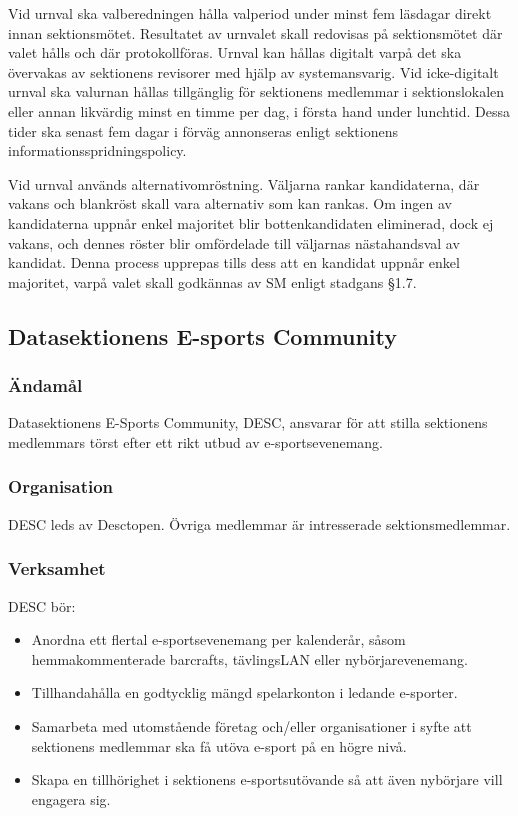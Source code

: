 \documentclass{dgovdoc}
\begin{document}
Vid urnval ska valberedningen hålla valperiod under minst fem läsdagar direkt
innan sektionsmötet. Resultatet av urnvalet skall redovisas på sektionsmötet
där valet hålls och där protokollföras. Urnval kan hållas digitalt varpå det
ska övervakas av sektionens revisorer med hjälp av systemansvarig. Vid icke-digitalt
urnval ska valurnan hållas tillgänglig för sektionens medlemmar i sektionslokalen
eller annan likvärdig minst en timme per dag, i första hand under lunchtid.
Dessa tider ska senast fem dagar i förväg annonseras enligt sektionens
informationsspridningspolicy.

Vid urnval används alternativomröstning. Väljarna rankar kandidaterna, där
vakans och blankröst skall vara alternativ som kan rankas. Om ingen av
kandidaterna uppnår enkel majoritet blir bottenkandidaten eliminerad, dock
ej vakans, och dennes röster blir omfördelade till väljarnas nästahandsval av
kandidat. Denna process upprepas tills dess att en kandidat uppnår enkel
majoritet, varpå valet skall godkännas av SM enligt stadgans §1.7.

\subsection{Datasektionens E-sports Community}

\subsubsection{Ändamål}

Datasektionens E-Sports Community, DESC, ansvarar för att stilla sektionens
medlemmars törst efter ett rikt utbud av e-sportsevenemang.

\subsubsection{Organisation}

DESC leds av Desctopen. Övriga medlemmar är intresserade
sektionsmedlemmar.

\subsubsection{Verksamhet}

DESC bör:

\begin{itemize}
\item Anordna ett flertal e-sportsevenemang per kalenderår, såsom hemmakommenterade
barcrafts, tävlingsLAN eller nybörjarevenemang.
\item Tillhandahålla en godtycklig mängd spelarkonton i ledande e-sporter.
\item Samarbeta med utomstående företag och/eller organisationer i syfte att sektionens
medlemmar ska få utöva e-sport på en högre nivå.
\item Skapa en tillhörighet i sektionens e-sportsutövande så att även nybörjare vill engagera
sig.
\end{itemize}
\end{document}
